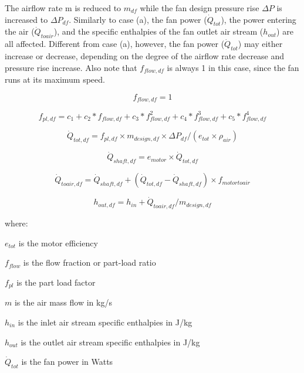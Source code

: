 The airflow rate m is reduced to \(m_{df}\) while the fan design pressure rise \(\Delta P\) is increased to \(\Delta P_{df}\). Similarly to case (a), the fan power (\(\dot Q_{tot}\)), the power entering the air (\(\dot Q_{toair}\)), and the specific enthalpies of the fan outlet air stream (\(h_{out}\)) are all affected. Different from case (a), however, the fan power (\(\dot Q_{tot}\)) may either increase or decrease, depending on the degree of the airflow rate decrease and pressure rise increase. Also note that \(f_{flow,df}\) is always 1 in this case, since the fan runs at its maximum speed.

\begin{equation}
f_{flow,df} = 1
\end{equation}

\begin{equation}
f_{pl,df} = c_{1} + c_{2}*f_{flow,df} + c_{3}*f_{flow,df}^2 + c_{4}*f_{flow,df}^3 + c_{5}*f_{flow,df}^4
\end{equation}

\begin{equation}
\dot{Q}_{tot,df} = f_{pl,df} \times m_{design,df} \times \Delta P_{df} / (e_{tot} \times \rho_{air} )
\end{equation}

\begin{equation}
\dot{Q}_{shaft,df} = e_{motor} \times \dot{Q}_{tot, df}
\end{equation}

\begin{equation}
\dot{Q}_{toair,df} = \dot{Q}_{shaft,df} +( \dot{Q}_{tot,df} - \dot{Q}_{shaft,df}) \times f_{motortoair}
\end{equation}

\begin{equation}
h_{out,df} = h_{in} + \dot{Q}_{toair,df} / m_{design,df}
\end{equation}

where:

\(e_{tot}\) is the motor efficiency

\(f_{flow}\) is the flow fraction or part-load ratio

\(f_{pl}\) is the part load factor

\(m\) is the air mass flow in kg/s

\(h_{in}\) is the inlet air stream specific enthalpies in J/kg

\(h_{out}\) is the outlet air stream specific enthalpies in J/kg

\(\dot{Q}_{tot}\) is the fan power in Watts

